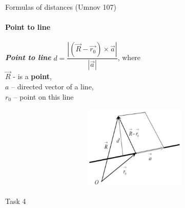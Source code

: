 \documentclass[aspectratio=169]{beamer}
\begin{document}
\begin{frame}[t]{Formulas of distances (Umnov 107)}
    \framesubtitle{Point to line}
    \begin{minipage}{0.6\textwidth}
        \textbf{\textit{Point to line}} $d = \dfrac{\left|(\vec{R}-\vec{r_0}) \times \vec{a}\right| }{\left|\vec{a}\right|}$, where \\ $\vec{R}$ - is a \textbf{point},\\ $a$ -- directed vector of a line, \\ $r_0$ -- point on this line
    \end{minipage}
    \begin{minipage}{0.39\textwidth}
        \begin{figure}[H]
            \centering\includegraphics[height=4cm,width=1\textwidth,keepaspectratio]{distance_1.png}
            \label{fig:distance_1.png}
        \end{figure}
    \end{minipage}
\end{frame}

\begin{frame}[t]{Task 4}
    \framesubtitle{}
\end{frame}
\end{document}
